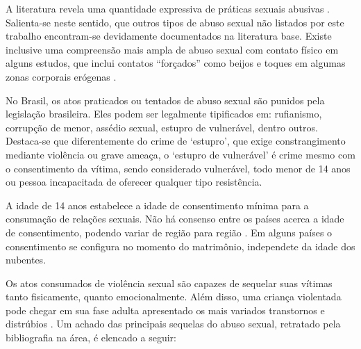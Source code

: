 \begin{parcolumns}{2}
\colplacechunks

\end{parcolumns}

A literatura revela uma quantidade expressiva de práticas sexuais abusivas \cite{sayao2006refazendo, santos2011guia, ibiapinainfluencias, ibiapinainfluencias, barros2016participaccao, lima2015violencia, habigzang2005abuso, moreschi2018violencia, deviolencia, saude2002notificacao}. Salienta-se neste sentido, que outros tipos de abuso sexual não listados por este trabalho encontram-se devidamente documentados na literatura base. Existe inclusive uma compreensão mais ampla de abuso sexual com contato físico em alguns estudos, que inclui contatos ``forçados'' como beijos e toques em algumas zonas corporais erógenas \cite{santos2009guia, sayao2006refazendo}.

No Brasil, os atos praticados ou tentados de abuso sexual são punidos pela legislação brasileira. Eles podem ser legalmente tipificados em: rufianismo, corrupção de menor, assédio sexual, estupro de vulnerável, dentro outros. Destaca-se que diferentemente do crime de `estupro', que exige constrangimento mediante violência ou grave ameaça, o `estupro de vulnerável' é crime mesmo com o consentimento da vítima, sendo considerado vulnerável, todo menor de 14 anos ou pessoa incapacitada de oferecer qualquer tipo resistência. 

A idade de 14 anos estabelece a idade de consentimento mínima para a consumação de relações sexuais. Não há consenso entre os países acerca a idade de consentimento, podendo variar de região para região \cite{bullough2005age}. Em alguns países o consentimento se configura no momento do matrimônio, independete da idade dos nubentes. 

Os atos consumados de violência sexual são capazes de sequelar suas vítimas tanto fisicamente, quanto emocionalmente. Além disso, uma criança violentada pode chegar em sua fase adulta apresentado os mais variados transtornos e distrúbios \cite{lima2018violencia}. Um achado das principais sequelas do abuso sexual, retratado pela bibliografia na área, é elencado a seguir:


